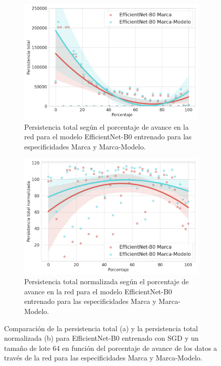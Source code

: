 \begin{figure}[H]
	\centering
	\begin{subfigure}{.5\textwidth}
		\centering
		\includegraphics[width=\linewidth]{img/general_efficientnet.png}
		\caption{Persistencia total según el porcentaje de avance en la red para el modelo EfficientNet-B0 entrenado para las especificidades Marca y Marca-Modelo.}
		\label{fig:efficientnet-1}
	\end{subfigure}%
	\begin{subfigure}{.5\textwidth}
		\centering
		\includegraphics[width=\linewidth]{img/general_efficientnet_norm.png}
		\caption{Persistencia total normalizada según el porcentaje de avance en la red para el modelo EfficientNet-B0 entrenado para las especificidades Marca y Marca-Modelo.}
		\label{fig:efficientnet-2}
	\end{subfigure}
	\caption{Comparación de la persistencia total (a) y la persistencia total normalizada (b) para EfficientNet-B0 entrenado con SGD y un tamaño de lote 64 en función del porcentaje de avance de los datos a través de la red para las especificidades Marca y Marca-Modelo.}
	\label{fig:efficientnet}
\end{figure}

